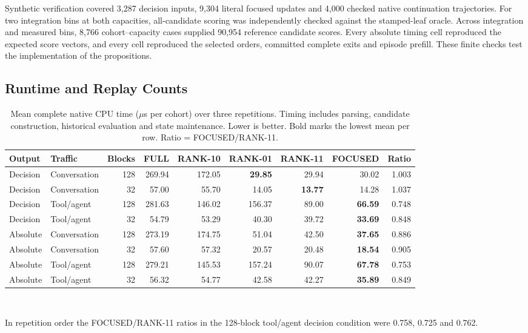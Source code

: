 \documentclass[11pt,letterpaper]{article}
\begin{document}
Synthetic verification covered 3,287 decision inputs, 9,304 literal focused updates and 4,000 checked native continuation trajectories. For two integration bins at both capacities, all-candidate scoring was independently checked against the stamped-leaf oracle. Across integration and measured bins, 8,766 cohort--capacity cases supplied 90,954 reference candidate scores. Every absolute timing cell reproduced the expected score vectors, and every cell reproduced the selected orders, committed complete exits and episode prefill. These finite checks test the implementation of the propositions.

\subsection{Runtime and Replay Counts}

\begin{table}[htbp]\centering\small
\caption{Mean complete native CPU time ($\mu$s per cohort) over three repetitions. Timing includes parsing, candidate construction, historical evaluation and state maintenance. Lower is better. Bold marks the lowest mean per row. Ratio = FOCUSED/RANK-11.}
\label{tab:timing}\par\vspace{3pt}
\setlength{\tabcolsep}{4pt}
\begin{tabular}{@{}llrrrrrrr@{}}\toprule
Output & Traffic & Blocks & FULL & RANK-10 & RANK-01 & RANK-11 & FOCUSED & Ratio\\\midrule
Decision & Conversation & 128 & 269.94 & 172.05 & \textbf{29.85} & 29.94 & 30.02 & 1.003\\
Decision & Conversation & 32 & 57.00 & 55.70 & 14.05 & \textbf{13.77} & 14.28 & 1.037\\
Decision & Tool/agent & 128 & 281.63 & 146.02 & 156.37 & 89.00 & \textbf{66.59} & 0.748\\
Decision & Tool/agent & 32 & 54.79 & 53.29 & 40.30 & 39.72 & \textbf{33.69} & 0.848\\
Absolute & Conversation & 128 & 273.19 & 174.75 & 51.04 & 42.50 & \textbf{37.65} & 0.886\\
Absolute & Conversation & 32 & 57.60 & 57.32 & 20.57 & 20.48 & \textbf{18.54} & 0.905\\
Absolute & Tool/agent & 128 & 279.21 & 145.53 & 157.24 & 90.07 & \textbf{67.78} & 0.753\\
Absolute & Tool/agent & 32 & 56.32 & 54.77 & 42.58 & 42.27 & \textbf{35.89} & 0.849\\
\bottomrule\end{tabular}\\[2pt]
\parbox{0.96\linewidth}{\footnotesize In repetition order the FOCUSED/RANK-11 ratios in the 128-block tool/agent decision condition were 0.758, 0.725 and 0.762.}
\end{table}
\end{document}
